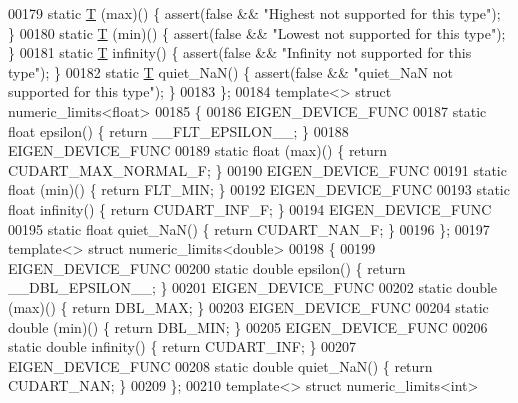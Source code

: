 \begin{DoxyCode}
00179   \textcolor{keyword}{static} \hyperlink{group___sparse_core___module}{T} (max)() \{ assert(\textcolor{keyword}{false} && \textcolor{stringliteral}{"Highest not supported for this type"}); \}
00180   \textcolor{keyword}{static} \hyperlink{group___sparse_core___module}{T} (min)() \{ assert(\textcolor{keyword}{false} && \textcolor{stringliteral}{"Lowest not supported for this type"}); \}
00181   \textcolor{keyword}{static} \hyperlink{group___sparse_core___module}{T} infinity() \{ assert(\textcolor{keyword}{false} && \textcolor{stringliteral}{"Infinity not supported for this type"}); \}
00182   \textcolor{keyword}{static} \hyperlink{group___sparse_core___module}{T} quiet\_NaN() \{ assert(\textcolor{keyword}{false} && \textcolor{stringliteral}{"quiet\_NaN not supported for this type"}); \}
00183 \};
00184 \textcolor{keyword}{template}<> \textcolor{keyword}{struct }numeric\_limits<float>
00185 \{
00186   EIGEN\_DEVICE\_FUNC
00187   \textcolor{keyword}{static} \textcolor{keywordtype}{float} epsilon() \{ \textcolor{keywordflow}{return} \_\_FLT\_EPSILON\_\_; \}
00188   EIGEN\_DEVICE\_FUNC
00189   \textcolor{keyword}{static} float (max)() \{ \textcolor{keywordflow}{return} CUDART\_MAX\_NORMAL\_F; \}
00190   EIGEN\_DEVICE\_FUNC
00191   \textcolor{keyword}{static} float (min)() \{ \textcolor{keywordflow}{return} FLT\_MIN; \}
00192   EIGEN\_DEVICE\_FUNC
00193   \textcolor{keyword}{static} \textcolor{keywordtype}{float} infinity() \{ \textcolor{keywordflow}{return} CUDART\_INF\_F; \}
00194   EIGEN\_DEVICE\_FUNC
00195   \textcolor{keyword}{static} \textcolor{keywordtype}{float} quiet\_NaN() \{ \textcolor{keywordflow}{return} CUDART\_NAN\_F; \}
00196 \};
00197 \textcolor{keyword}{template}<> \textcolor{keyword}{struct }numeric\_limits<double>
00198 \{
00199   EIGEN\_DEVICE\_FUNC
00200   \textcolor{keyword}{static} \textcolor{keywordtype}{double} epsilon() \{ \textcolor{keywordflow}{return} \_\_DBL\_EPSILON\_\_; \}
00201   EIGEN\_DEVICE\_FUNC
00202   \textcolor{keyword}{static} double (max)() \{ \textcolor{keywordflow}{return} DBL\_MAX; \}
00203   EIGEN\_DEVICE\_FUNC
00204   \textcolor{keyword}{static} double (min)() \{ \textcolor{keywordflow}{return} DBL\_MIN; \}
00205   EIGEN\_DEVICE\_FUNC
00206   \textcolor{keyword}{static} \textcolor{keywordtype}{double} infinity() \{ \textcolor{keywordflow}{return} CUDART\_INF; \}
00207   EIGEN\_DEVICE\_FUNC
00208   \textcolor{keyword}{static} \textcolor{keywordtype}{double} quiet\_NaN() \{ \textcolor{keywordflow}{return} CUDART\_NAN; \}
00209 \};
00210 \textcolor{keyword}{template}<> \textcolor{keyword}{struct }numeric\_limits<int>

\end{DoxyCode}

